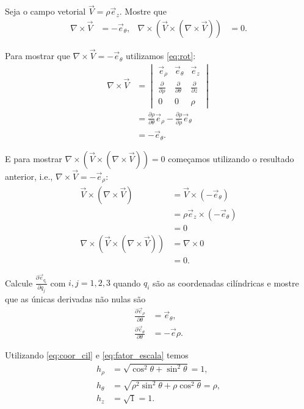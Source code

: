 \documentclass[a4paper,12pt, leqno, answers]{exam}
\newcommand{\devp}[2]{\frac{\partial #1}{\partial #2}}
\begin{document}
\begin{questions}
    \question Seja o campo vetorial $\vec{V} = \rho \vec{e}_z$. Mostre que
    \begin{align*}
        \nabla \times \vec{V} &= -\vec{e}_\theta, &
        \nabla \times (\vec{V} \times (\nabla \times \vec{V})) &= 0.
    \end{align*}
    \begin{solution}
        Para mostrar que $\nabla \times \vec{V} = - \vec{e}_\theta$ utilizamos \eqref{eq:rot}:
        \begin{align*}
            \nabla \times \vec{V} &= \begin{vmatrix}
                  \vec{e}_\rho & \vec{e}_\theta & \vec{e}_z \\
                  \devp{}{\rho} & \devp{}{\theta} & \devp{}{z} \\
                  0 & 0 & \rho
            \end{vmatrix} \\
            &= \devp{\rho}{\theta} \vec{e}_\rho - \devp{\rho}{\rho} \vec{e}_\theta \\
            &= - \vec{e}_\theta.
        \end{align*}
  
        E para mostrar $\nabla \times \left(\vec{V} \times \left(\nabla \times \vec{V}\right)\right) = 0$ come\c{c}amos utilizando o resultado anterior, i.e., $\nabla \times \vec{V} = - \vec{e}_\rho$:
        \begin{align*}
            \vec{V} \times \left(\nabla \times \vec{V}\right) &= \vec{V} \times \left(- \vec{e}_\theta\right) \\
            &= \rho \vec{e}_z \times \left(- \vec{e}_\theta\right) \\
            &= 0 \\
            \nabla \times \left(\vec{V} \times \left(\nabla \times \vec{V}\right)\right) &= \nabla \times 0 \\
            &= 0.
        \end{align*}
    \end{solution}
  
    \question Calcule $\devp{\vec{e}_{q_i}}{q_j}$ com $i,j = 1, 2, 3$ quando $q_i$ s\~{a}o as coordenadas cil\'{i}ndricas e mostre que as únicas derivadas n\~{a}o nulas s\~{a}o
    \begin{align*}
        \devp{\vec{e}_\rho}{\theta} &= \vec{e}_\theta, \\
        \devp{\vec{e}_\theta}{\theta} &= - \vec{e}\rho.
    \end{align*}
    \begin{solution}
        Utilizando \eqref{eq:coor_cil} e \eqref{eq:fator_escala} temos
        \begin{align*}
            h_\rho &= \sqrt{\cos^2 \theta + \sin^2 \theta} = 1, \\
            h_\theta &= \sqrt{\rho^2 \sin^2 \theta + \rho \cos^2 \theta} = \rho, \\
            h_z &= \sqrt{1} = 1.
        \end{align*}
  

\end{solution}
\end{questions}
\end{document}
